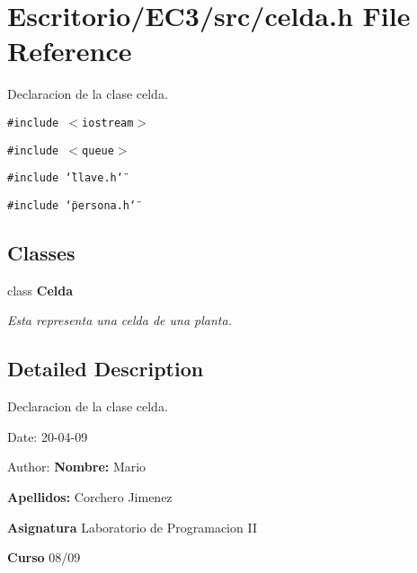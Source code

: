 \section{Escritorio/EC3/src/celda.h File Reference}
\label{celda_8h}
Declaracion de la clase celda. 

{\tt \#include $<$iostream$>$}\par
{\tt \#include $<$queue$>$}\par
{\tt \#include \char`\"{}llave.h\char`\"{}}\par
{\tt \#include \char`\"{}persona.h\char`\"{}}\par
\subsection*{Classes}
\begin{CompactItemize}
\item 
class {\bf Celda}
\begin{CompactList}\small\item\em Esta representa una celda de una planta. \item\end{CompactList}\end{CompactItemize}


\subsection{Detailed Description}
Declaracion de la clase celda. 

\begin{Desc}
\item[Date:]20-04-09 \end{Desc}
\begin{Desc}
\item[Author:]{\bf Nombre:} Mario \par
 {\bf Apellidos:} Corchero Jimenez \par
 {\bf Asignatura} Laboratorio de Programacion II \par
 {\bf Curso} 08/09 \end{Desc}
